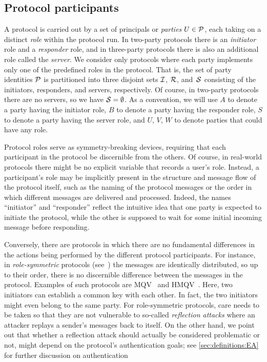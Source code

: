 \subsection{Protocol participants}\label{sec:definitions:unified:participants}
A protocol is carried out by a set of principals or \emph{parties} $U \in \mathcal{P}$,
each taking on a distinct \emph{role} within the protocol run.
In two-party protocols there is an \emph{initiator} role and a \emph{responder} role,
and in three-party protocols there is also an additional role called the \emph{server}.
We consider only protocols where each party implements only one of the predefined roles in the protocol.
That is,
the set of party identities  $\mathcal{P}$ is partitioned into three disjoint sets $\mathcal{I}$, $\mathcal{R}$, and~$\mathcal{S}$
consisting of the initiators, responders, and servers,
respectively.
Of course,
in two-party protocols there are no servers, 
so we have $\mathcal{S} = \emptyset$.
As a convention, 
we will use $A$ to denote a party having the initiator role,
$B$ to denote a party having the responder role,
$S$ to denote a party having the server role,
and $U$, $V$, $W$ to denote parties that could have any role.




Protocol roles serve as symmetry-breaking devices,
requiring that each participant in the protocol be discernible from the others.
Of course,
in real-world protocols there might be no explicit variable that records a user's role.
Instead,
a participant's role may be implicitly present in the structure and message flow of the protocol itself,
such as the naming of the protocol messages or the order in which different messages are delivered and processed. 
Indeed,
the names ``initiator'' and ``responder'' reflect the intuitive idea that one party is expected to initiate the protocol,
while the other is supposed to wait for some initial incoming message before responding.   

Conversely,
there are protocols in which there are no fundamental differences in the actions being performed by the different protocol participants.
For instance,
in \emph{role-symmetric} protocols (see~\cite{EPRINT:Cremers09,ASIACCS:Cremers11}) the messages are identically distributed,
so up to their order,
there is no discernible difference between the messages in the protocol. 
Examples of such protocols are MQV~\cite{LawMQSV:2003:MQV} and HMQV~\cite{C:Krawczyk05}.
Here,
two initiators can establish a common key with each other.
In fact,
the two initiators might even belong to the same party.
For role-symmetric protocols,
care needs to be taken so that they are not vulnerable to so-called \emph{reflection attacks} \cite{ESORICS:Cremers11}
where an attacker replays a sender's messages back to itself.
On the other hand,
we point out that whether a reflection attack should actually be considered problematic or not,
might depend on the protocol's authentication goals;
see \cref{sec:definitions:EA} for further discussion on authentication
%



